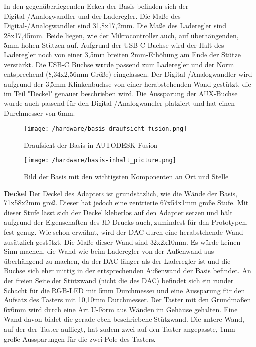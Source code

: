 \documentclass[11pt, twoside]{article}
\begin{document}
In den gegenüberliegenden Ecken der Basis befinden sich der Digital-/Analogwandler und der Laderegler. Die Maße des Digital-/Analogwandler sind 31,8x17,2mm. Die Maße des Laderegler sind 28x17,45mm. Beide liegen, wie der Mikrocontroller auch, auf überhängenden, 5mm hohen Stützen auf. Aufgrund der USB-C Buchse wird der Halt des Laderegler noch von einer 3,5mm breiten 2mm-Erhöhung am Ende der Stütze verstärkt. Die USB-C Buchse wurde passend zum Laderegler und der Norm entsprechend (8,34x2,56mm Größe) eingelassen. Der Digital-/Analogwandler wird aufgrund der 3,5mm Klinkenbuchse von einer herabstehenden Wand gestützt, die im Teil "Deckel" genauer beschrieben wird. Die Aussparung der AUX-Buchse wurde auch passend für den Digital-/Analogwandler platziert und hat einen Durchmesser von 6mm.\newline
\begin{figure}[H]
\begin{flushleft}
\texttt{[image: /hardware/basis-draufsicht\_fusion.png]}
\caption{Draufsicht der Basis in AUTODESK Fusion}
\end{flushleft}
\end{figure}
\begin{figure}[H]
\begin{flushleft}
\texttt{[image: /hardware/basis-inhalt\_picture.png]}
\caption{Bild der Basis mit den wichtigsten Komponenten an Ort und Stelle}
\end{flushleft}
\end{figure}
\noindent \textbf{Deckel} \newline
Der Deckel des Adapters ist grundsätzlich, wie die Wände der Basis, 71x58x2mm groß. Dieser hat jedoch eine zentrierte 67x54x1mm große Stufe. Mit dieser Stufe lässt sich der Deckel kleberlos auf den Adapter setzen und hält aufgrund der Eigenschaften des 3D-Drucks auch, zumindest für den Prototypen, fest genug.
Wie schon erwähnt, wird der DAC durch eine herabstehende Wand zusätzlich gestützt. Die Maße dieser Wand sind 32x2x10mm. Es würde keinen Sinn machen, die Wand wie beim Laderegler von der Außenwand aus überhängend zu machen, da der DAC länger als der Laderegler ist und die Buchse sich eher mittig in der entsprechenden Außenwand der Basis befindet.\newline
An der freien Seite der Stützwand (nicht die des DAC) befindet sich ein runder Schacht für die RGB-LED mit 5mm Durchmesser und eine Aussparung für den Aufsatz des Tasters mit 10,10mm Durchmesser. Der Taster mit den Grundmaßen 6x6mm wird durch eine Art U-Form aus Wänden im Gehäuse gehalten. Eine Wand davon bildet die gerade eben beschriebene Stützwand. Die untere Wand, auf der der Taster aufliegt, hat zudem zwei auf den Taster angepasste, 1mm große Aussparungen für die zwei Pole des Tasters.\newline
\end{document}
